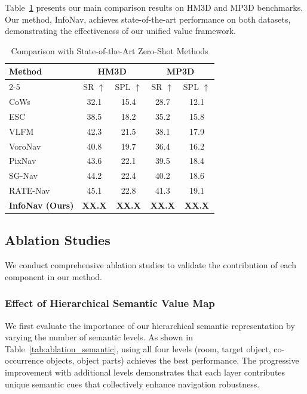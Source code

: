 \documentclass[conference]{IEEEtran}
\begin{document}
Table~\ref{tab:main_results} presents our main comparison results on HM3D and MP3D benchmarks. Our method, InfoNav, achieves state-of-the-art performance on both datasets, demonstrating the effectiveness of our unified value framework.

\begin{table}[t]
\centering
\caption{Comparison with State-of-the-Art Zero-Shot Methods}
\label{tab:main_results}
\begin{tabular}{l|cc|cc}
\toprule
\multirow{2}{*}{Method} & \multicolumn{2}{c|}{HM3D} & \multicolumn{2}{c}{MP3D} \\
\cline{2-5}
& SR $\uparrow$ & SPL $\uparrow$ & SR $\uparrow$ & SPL $\uparrow$ \\
\midrule
CoWs~\cite{gadre2023cows} & 32.1 & 15.4 & 28.7 & 12.1 \\
ESC~\cite{zhou2023esc} & 38.5 & 18.2 & 35.2 & 15.8 \\
VLFM~\cite{yokoyama2024vlfm} & 42.3 & 21.5 & 38.1 & 17.9 \\
VoroNav~\cite{wu2024voronav} & 40.8 & 19.7 & 36.4 & 16.2 \\
PixNav~\cite{cai2024pixnav} & 43.6 & 22.1 & 39.5 & 18.4 \\
SG-Nav~\cite{yin2024sgnav} & 44.2 & 22.4 & 40.2 & 18.6 \\
RATE-Nav~\cite{li2024ratenav} & 45.1 & 22.8 & 41.3 & 19.1 \\
\midrule
\textbf{InfoNav (Ours)} & \textbf{XX.X} & \textbf{XX.X} & \textbf{XX.X} & \textbf{XX.X} \\
\bottomrule
\end{tabular}
\end{table}

\subsection{Ablation Studies}

We conduct comprehensive ablation studies to validate the contribution of each component in our method.

\subsubsection{Effect of Hierarchical Semantic Value Map}

We first evaluate the importance of our hierarchical semantic representation by varying the number of semantic levels. As shown in Table~\ref{tab:ablation_semantic}, using all four levels (room, target object, co-occurrence objects, object parts) achieves the best performance. The progressive improvement with additional levels demonstrates that each layer contributes unique semantic cues that collectively enhance navigation robustness.
\end{document}
